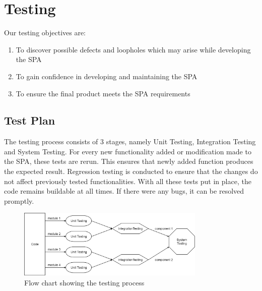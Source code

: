 \documentclass[12pt]{article}
\begin{document}
{{{{{{{{{{\section{Testing}
Our testing objectives are: 
\begin{enumerate}
\item To discover possible defects and loopholes which may arise while developing the SPA
\item To gain confidence in developing and maintaining the  SPA
\item To ensure the final product meets the SPA requirements
\end{enumerate}
\subsection{Test Plan}
The testing process consists of 3 stages, namely Unit Testing, Integration Testing and System Testing. For every new functionality added or modification made to the SPA, these tests are rerun. This ensures that newly added function produces the expected result. Regression testing is conducted to ensure that the changes do not affect previously tested functionalities. With all these tests put in place, the code remains buildable at all times. If there were any bugs, it can be resolved promptly.
\begin{figure}[!htbp]
  \centering 
  \caption{Flow chart showing the testing process}
 \includegraphics[width=0.8\textwidth]{Testing_process.png}
\end{figure}
}}}}}}}}}}
\end{document}
